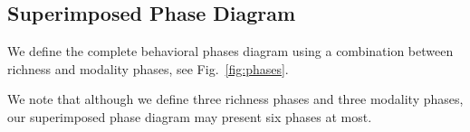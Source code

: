 \documentclass[%
 amsmath,amssymb,
 reprint,%
]{revtex4-2}
\begin{document}



\subsection{Superimposed Phase Diagram}

We define the complete behavioral phases diagram using a combination between richness and modality phases, see  Fig.~\ref{fig:phases}.

We note that although we define three richness phases and three modality phases, our superimposed phase diagram may present six phases at most.  
\end{document}
